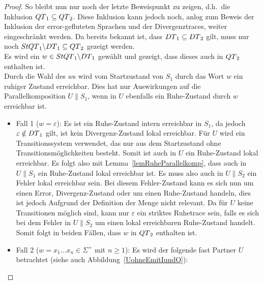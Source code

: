 \begin{proof}
  So bleibt nun nur noch der letzte Beweispunkt zu zeigen, d.h.\ die Inklusion
  $QT{}_1\subseteq QT{}_2$. Diese Inklusion kann jedoch noch, anlog zum
  Beweis der Inklusion der error-gefluteten Sprachen und der Divergenztraces,
  weiter eingeschränkt werden. Da bereits bekannt ist, dass
  $DT{}_1\subseteq DT{}_2$ gilt, muss nur noch $StQT{}_1\backslash
  DT{}_1\subseteq QT{}_2$ gezeigt werden.\\
  Es wird ein $w\in StQT{}_1\backslash DT{}_1$ gewählt und gezeigt, dass
  dieses auch in $QT{}_2$ enthalten ist.\\
  Durch die Wahl des $w$s wird vom Startzustand von $S_1$ durch das Wort $w$
  ein ruhiger Zustand erreichbar. Dies hat nur Auswirkungen auf die
  Parallelkomposition $U\|S_1$, wenn in $U$ ebenfalls ein Ruhe-Zustand durch
  $w$ erreichbar ist.
  \begin{itemize}
    \item Fall 1 ($w=\varepsilon$): Es ist ein Ruhe-Zustand intern erreichbar
      in $S_1$, da jedoch $\varepsilon\notin DT{}_1$ gilt, ist kein
      Divergenz-Zustand lokal erreichbar. Für $U$ wird ein Transitionssystem
      verwendet, das nur aus dem Startzustand ohne Transitionsmöglichkeiten
      besteht. Somit ist auch in $U$ ein Ruhe-Zustand lokal erreichbar. Es
      folgt also mit Lemma~\ref{lemRuheParallelkomp}, dass auch in $U\|S_1$ ein
      Ruhe-Zustand lokal erreichbar ist. Es muss also auch in $U\|S_2$ ein
      Fehler lokal erreichbar sein. Bei diesem Fehler-Zustand kann es sich nun
      um einen Error, Divergenz-Zustand oder um einen Ruhe-Zustand handeln,
      dies ist jedoch Aufgrund der Definition der Menge \QT{} nicht relevant.
      Da für $U$ keine Transitionen möglich sind, kann nur $\varepsilon$ ein
      striktes Ruhetrace sein, falls es sich bei dem Fehler in $U\|S_2$ um
      einen lokal erreichbaren Ruhe-Zustand handelt. Somit folgt in beiden
      Fällen, dass $w$ in $QT{}_2$ enthalten ist.
    \item Fall 2 ($w=x_1\dots x_n\in \Sigma ^+$ mit $n\geq 1$): Es wird der
      folgende fast Partner $U$ betrachtet (siehe auch
      Abbildung~\ref{UohneEmitIundO}):
\end{itemize}
\end{proof}
